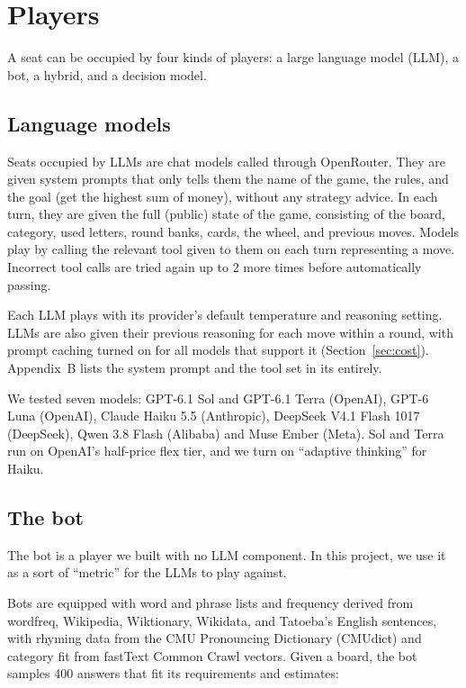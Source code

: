 \section{Players}\label{sec:players}

A seat can be occupied by four kinds of players: a large language model (LLM), a bot, a hybrid, and a decision model. 

\subsection{Language models}

Seats occupied by LLMs are chat models called through OpenRouter. They are given system prompts that only tells them the name of the game, the rules, and the goal (get the highest sum of money), without any strategy advice. In each turn, they are given the full (public) state of the game, consisting of the board, category, used letters, round banks, cards, the wheel, and previous moves. Models play by calling the relevant tool given to them on each turn representing a move. Incorrect tool calls are tried again up to 2 more times before automatically passing.

Each LLM plays with its provider's default temperature and reasoning setting. LLMs are also given their previous reasoning for each move within a round, with prompt caching turned on for all models that support it (Section~\ref{sec:cost}). Appendix~B lists the system prompt and the tool set in its entirely.

We tested seven models: GPT-6.1 Sol and GPT-6.1 Terra (OpenAI), GPT-6 Luna (OpenAI), Claude Haiku 5.5 (Anthropic), DeepSeek V4.1 Flash 1017 (DeepSeek), Qwen 3.8 Flash (Alibaba) and Muse Ember (Meta). Sol and Terra run on OpenAI's half-price flex tier, and we turn on ``adaptive thinking'' for Haiku.

\subsection{The bot}

The bot is a player we built with no LLM component. In this project, we use it as a sort of ``metric'' for the LLMs to play against. 

Bots are equipped with word and phrase lists and frequency derived from wordfreq, Wikipedia, Wiktionary, Wikidata, and Tatoeba's English sentences, with rhyming data from the CMU Pronouncing Dictionary (CMUdict) and category fit from fastText Common Crawl vectors. Given a board, the bot samples 400 answers that fit its requirements and estimates:

